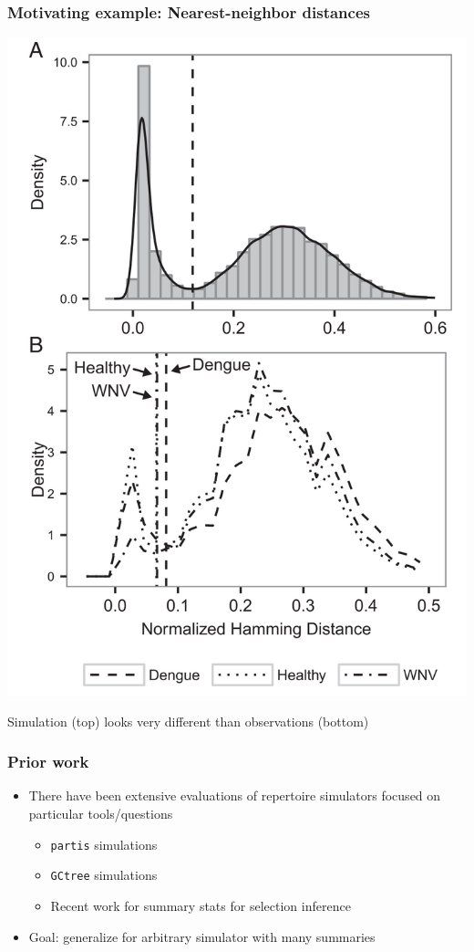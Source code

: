 \documentclass[mathserif,compress]{beamer}
\renewcommand\;{\,}
\begin{document}
\begin{frame}

\begin{center}\frametitle{Motivating example: Nearest-neighbor distances}
\includegraphics[width=0.4\linewidth]{Images/Dengue.png}
\end{center}
Simulation (top) looks very different than observations (bottom)
\end{frame}

\begin{frame}\frametitle{Prior work}
\begin{itemize}
\item
There have been extensive evaluations of repertoire simulators focused on particular tools/questions	
\medskip
\begin{itemize}
\item
 \texttt{partis} simulations
 \bigskip
 \item
 \texttt{GCtree} simulations
 \bigskip
 \item
 Recent work for summary stats for selection inference
  \end{itemize}
\bigskip
\item Goal: generalize for arbitrary simulator with many summaries
\end{itemize}
\end{frame}
\end{document}
